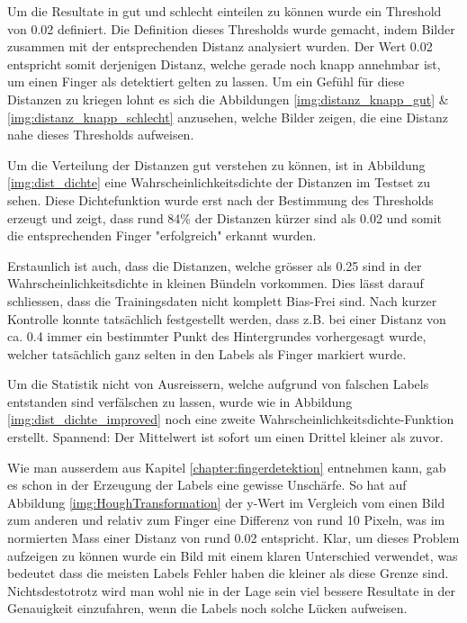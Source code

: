 Um die Resultate in gut und schlecht einteilen zu können wurde ein Threshold von 0.02 definiert.
Die Definition dieses Thresholds wurde gemacht, indem Bilder zusammen mit der entsprechenden Distanz analysiert wurden.
Der Wert 0.02 entspricht somit derjenigen Distanz, welche gerade noch knapp annehmbar ist, um einen Finger als detektiert gelten zu lassen.
Um ein Gefühl für diese Distanzen zu kriegen lohnt es sich die Abbildungen \ref{img:distanz_knapp_gut} \& \ref{img:distanz_knapp_schlecht} anzusehen, welche Bilder zeigen, die eine Distanz nahe dieses Thresholds aufweisen. 

Um die Verteilung der Distanzen gut verstehen zu können, ist in Abbildung \ref{img:dist_dichte} eine Wahrscheinlichkeitsdichte der Distanzen im Testset zu sehen. Diese Dichtefunktion wurde erst nach der Bestimmung des Thresholds erzeugt und zeigt, dass rund 84\% der Distanzen kürzer sind als 0.02 und somit die entsprechenden Finger "erfolgreich" erkannt wurden.

Erstaunlich ist auch, dass die Distanzen, welche grösser als 0.25 sind in der Wahrscheinlichkeitsdichte in kleinen Bündeln vorkommen. 
Dies lässt darauf schliessen, dass die Trainingsdaten nicht komplett Bias-Frei sind.
Nach kurzer Kontrolle konnte tatsächlich festgestellt werden, dass z.B. bei einer Distanz von ca. 0.4 immer ein bestimmter Punkt des Hintergrundes vorhergesagt wurde, welcher tatsächlich ganz selten in den Labels als Finger markiert wurde. 

Um die Statistik nicht von Ausreissern, welche aufgrund von falschen Labels entstanden sind verfälschen zu lassen, wurde wie in Abbildung \ref{img:dist_dichte_improved} noch eine zweite Wahrscheinlichkeitsdichte-Funktion erstellt. Spannend: Der Mittelwert ist sofort um einen Drittel kleiner als zuvor. 

Wie man ausserdem aus Kapitel \ref{chapter:fingerdetektion} entnehmen kann, gab es schon in der Erzeugung der Labels eine gewisse Unschärfe.
So hat auf Abbildung \ref{img:HoughTransformation}  der y-Wert im Vergleich vom einen Bild zum anderen und relativ zum Finger eine Differenz von rund 10 Pixeln, was im normierten Mass einer Distanz von rund 0.02 entspricht.
Klar, um dieses Problem aufzeigen zu können wurde ein Bild mit einem klaren Unterschied verwendet, was bedeutet dass die meisten Labels Fehler haben die kleiner als diese Grenze sind.
Nichtsdestotrotz wird man wohl nie in der Lage sein viel bessere Resultate in der Genauigkeit einzufahren, wenn die Labels noch solche Lücken aufweisen.

